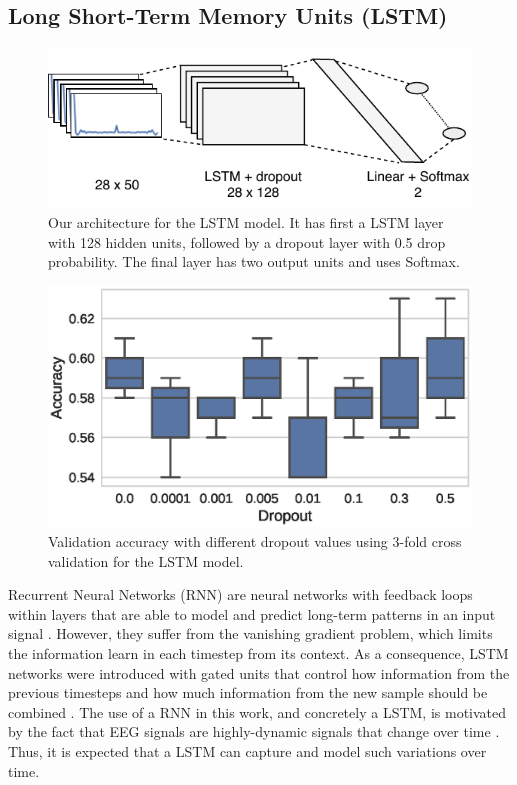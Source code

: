 \documentclass[10pt,conference,compsocconf]{IEEEtran}
\begin{document}
\subsection{Long Short-Term Memory Units (LSTM)}
\label{ssec:methods_LSTM}

\begin{figure}[t]
    \centering
    \includegraphics[width=\linewidth]{figures/LSTM_archi.pdf}
    \caption{Our architecture for the LSTM model. It has first a LSTM layer with 128 hidden units, followed by a dropout layer with 0.5 drop probability. The final layer has two output units and uses Softmax.}
    \label{fig:archi_LSTM}
\end{figure}


\begin{figure}[t]
    \centering
    \includegraphics[width=0.9\linewidth]{figures/lstm_dropout.eps}
    \caption{Validation accuracy with different dropout values using 3-fold cross validation for the LSTM model.}
    \label{fig:dropout_LSTM}
\end{figure}


Recurrent Neural Networks (RNN) are neural networks with feedback loops within layers that are able to model and predict long-term patterns in an input signal \cite{Elman90findingstructure}. However, they suffer from the vanishing gradient problem, which limits the information learn in each timestep from its context. As a consequence, LSTM networks were introduced with gated units that control how information from the previous timesteps and how much information from the new sample should be combined \cite{Jozefowicz:2015:EER:3045118.3045367}. The use of a RNN in this work, and concretely a LSTM, is motivated by the fact that EEG signals are highly-dynamic signals that change over time  \cite{LSTM}. Thus, it is expected that a LSTM can capture and model such variations over time.
\end{document}
